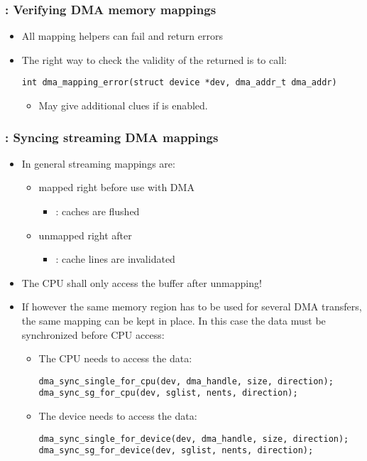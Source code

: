 \begin{frame}[fragile]
  \frametitle{: Verifying DMA memory mappings}
  \begin{itemize}
  \item All mapping helpers can fail and return errors
  \item The right way to check the validity of the returned
     is to call:
\begin{verbatim}
int dma_mapping_error(struct device *dev, dma_addr_t dma_addr)
\end{verbatim}
    \begin{itemize}
    \item May give additional clues if  is
      enabled.
    \end{itemize}
  \end{itemize}
\end{frame}

\begin{frame}[fragile]
  \frametitle{: Syncing streaming DMA mappings}
  \begin{itemize}
  \item In general streaming mappings are:
    \begin{itemize}
    \item mapped right before use with DMA
      \begin{itemize}
      \item {}: caches are flushed
      \end{itemize}
    \item unmapped right after
      \begin{itemize}
      \item {}: cache lines are invalidated
      \end{itemize}
    \end{itemize}
  \item The CPU shall only access the buffer after unmapping!
  \item If however the same memory region has to be used for several DMA
    transfers, the same mapping can be kept in place. In this case the
    data must be synchronized before CPU access:
    \begin{itemize}
    \item The CPU needs to access the data:
\begin{verbatim}
dma_sync_single_for_cpu(dev, dma_handle, size, direction);
dma_sync_sg_for_cpu(dev, sglist, nents, direction);
\end{verbatim}
    \item The device needs to access the data:
\begin{verbatim}
dma_sync_single_for_device(dev, dma_handle, size, direction);
dma_sync_sg_for_device(dev, sglist, nents, direction);
\end{verbatim}
    \end{itemize}
  \end{itemize}
\end{frame}

